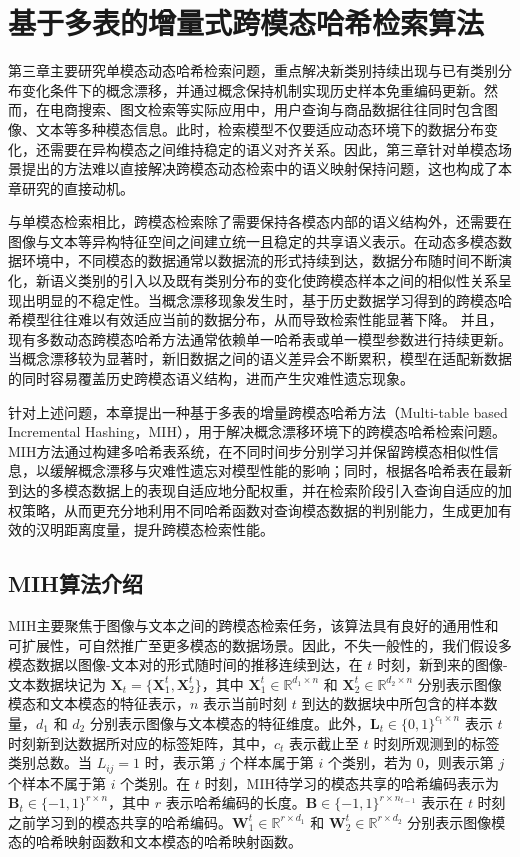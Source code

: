 \setlength{\parskip}{0pt}
\chapter{基于多表的增量式跨模态哈希检索算法}
\label{chap:mih}
第三章主要研究单模态动态哈希检索问题，重点解决新类别持续出现与已有类别分布变化条件下的概念漂移，并通过概念保持机制实现历史样本免重编码更新。然而，在电商搜索、图文检索等实际应用中，用户查询与商品数据往往同时包含图像、文本等多种模态信息。此时，检索模型不仅要适应动态环境下的数据分布变化，还需要在异构模态之间维持稳定的语义对齐关系。因此，第三章针对单模态场景提出的方法难以直接解决跨模态动态检索中的语义映射保持问题，这也构成了本章研究的直接动机。

与单模态检索相比，跨模态检索除了需要保持各模态内部的语义结构外，还需要在图像与文本等异构特征空间之间建立统一且稳定的共享语义表示。在动态多模态数据环境中，不同模态的数据通常以数据流的形式持续到达，数据分布随时间不断演化，新语义类别的引入以及既有类别分布的变化使跨模态样本之间的相似性关系呈现出明显的不稳定性。当概念漂移现象发生时，基于历史数据学习得到的跨模态哈希模型往往难以有效适应当前的数据分布，从而导致检索性能显著下降。
并且，现有多数动态跨模态哈希方法通常依赖单一哈希表或单一模型参数进行持续更新。当概念漂移较为显著时，新旧数据之间的语义差异会不断累积，模型在适配新数据的同时容易覆盖历史跨模态语义结构，进而产生灾难性遗忘现象。

针对上述问题，本章提出一种基于多表的增量跨模态哈希方法（Multi-table based Incremental Hashing，MIH），用于解决概念漂移环境下的跨模态哈希检索问题。MIH方法通过构建多哈希表系统，在不同时间步分别学习并保留跨模态相似性信息，以缓解概念漂移与灾难性遗忘对模型性能的影响；同时，根据各哈希表在最新到达的多模态数据上的表现自适应地分配权重，并在检索阶段引入查询自适应的加权策略，从而更充分地利用不同哈希函数对查询模态数据的判别能力，生成更加有效的汉明距离度量，提升跨模态检索性能。

\section{MIH算法介绍}
MIH主要聚焦于图像与文本之间的跨模态检索任务，该算法具有良好的通用性和可扩展性，可自然推广至更多模态的数据场景。因此，不失一般性的，我们假设多模态数据以图像-文本对的形式随时间的推移连续到达，在 $t$ 时刻，新到来的图像-文本数据块记为 $\mathbf{X}_t=\{\mathbf{X}_1^t, \mathbf{X}_2^t\}$，其中 $\mathbf{X}_1^t \in \mathbb{R}^{d_1 \times n}$ 和 $\mathbf{X}_2^t \in \mathbb{R}^{d_2 \times n}$ 分别表示图像模态和文本模态的特征表示，$n$ 表示当前时刻 $t$ 到达的数据块中所包含的样本数量，$d_1$ 和 $d_2$ 分别表示图像与文本模态的特征维度。此外，$\mathbf{L}_t \in \{0,1\}^{c_t \times n}$ 表示 $t$ 时刻新到达数据所对应的标签矩阵，其中，$c_t$ 表示截止至 $t$ 时刻所观测到的标签类别总数。当 $L_{ij}=1$ 时，表示第 $j$ 个样本属于第 $i$ 个类别，若为 $0$，则表示第 $j$ 个样本不属于第 $i$ 个类别。在 $t$ 时刻，MIH待学习的模态共享的哈希编码表示为 $\mathbf{B}_t \in \{-1,1\}^{r \times n}$，其中 $r$ 表示哈希编码的长度。$\mathbf{B} \in \{-1,1\}^{r \times n_{t-1}}$ 表示在 $t$ 时刻之前学习到的模态共享的哈希编码。$\mathbf{W}_1^t \in \mathbb{R}^{r \times d_1}$ 和 $\mathbf{W}_2^t \in \mathbb{R}^{r \times d_2}$ 分别表示图像模态的哈希映射函数和文本模态的哈希映射函数。

